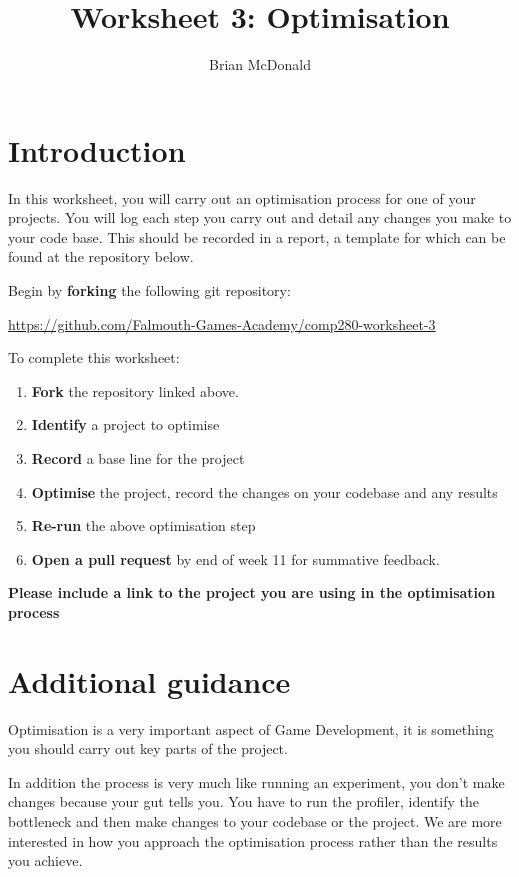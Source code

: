 \documentclass{../../../fal_assignment}
\title{Worksheet 3: Optimisation}
\author{Brian McDonald}
\begin{document}
\maketitle


\section*{Introduction}

In this worksheet, you will carry out an optimisation process for one of your projects. You will log each step you carry out and detail any changes you make to your code base. This should be recorded in a report, a template for which can be found at the repository below.

Begin by \textbf{forking} the following git repository:

\begin{center}
	\url{https://github.com/Falmouth-Games-Academy/comp280-worksheet-3}
\end{center}

To complete this worksheet:

\begin{enumerate}
	\item \textbf{Fork} the repository linked above.
	\item \textbf{Identify} a project to optimise
	\item \textbf{Record} a base line for the project
	\item \textbf{Optimise} the project, record the changes on your codebase and any results
	\item \textbf{Re-run} the above optimisation step
	\item \textbf{Open a pull request} by end of week 11 for summative feedback.
\end{enumerate}

\textbf{Please include a link to the project you are using in the optimisation process}

\section*{Additional guidance}

Optimisation is a very important aspect of Game Development, it is something you should carry out key parts of the project.

In addition the process is very much like running an experiment, you don't make changes because your gut tells you. You have to run the profiler, identify the bottleneck and then make changes to your codebase or the project. We are more interested in how you approach the optimisation process rather than the results you achieve.
\end{document}
